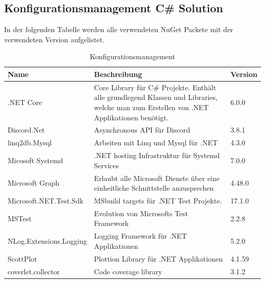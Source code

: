 \documentclass[a4paper, table]{article}
\begin{document}
\subsection{Konfigurationsmanagement C\# Solution}
In der folgenden Tabelle werden alle verwendeten NuGet Packete mit der verwendeten Version aufgelistet.

\begin{table}[h]
    \centering
    \begin{tabular}{|l|p{20em}|l|}
        \hline
        \rowcolor[gray]{.9} Name & Beschreibung & Version \\
        \hline
        .NET Core & Core Library für C\# Projekte.
        Enthält alle grundlegend Klassen und Libraries, welche man zum Erstellen von .NET Applikationen benötigt. & 6.0.0 \\
        \hline
        Discord.Net & Asynchronous API für Discord & 3.8.1 \\
        \hline
        linq2db.Mysql & Arbeiten mit Linq und Mysql für .NET & 4.3.0 \\
        \hline
        Micosoft Systemd & .NET hosting Infrastruktur für Systemd Services & 7.0.0 \\
        \hline
        Microsoft Graph & Erlaubt alle Microsoft Dienste über eine einheitliche Schnittstelle anzusprechen & 4.48.0 \\
        \hline
        Microsoft.NET.Test.Sdk & MSbuild targets für .NET Test Projekte. & 17.1.0 \\
        \hline
        MSTest & Evolution von Microsofts Test Framework & 2.2.8 \\
        \hline
        NLog.Extensions.Logging & Logging Framework für .NET Applikationen & 5.2.0 \\
        \hline
        ScottPlot & Plottion Library für .NET Applikationen & 4.1.59 \\
        \hline
        coverlet.collector & Code coverage library & 3.1.2 \\
        \hline
    \end{tabular}
    \caption{Konfigurationsmanagement}
    \label{tab: Konfigurationsmanagement}
\end{table}
\end{document}
